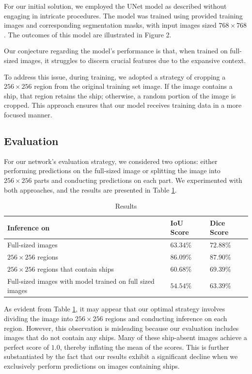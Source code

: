 \documentclass{article}
\begin{document}
For our initial solution, we employed the UNet model as described without engaging in intricate procedures.
The model was trained using provided training images and corresponding segmentation masks, with input
images sized \(768 \times 768\). The outcomes of this model are illustrated in Figure 2.

Our conjecture regarding the model's performance is that, when trained on full-sized images, it struggles
to discern crucial features due to the expansive context.

To address this issue, during training, we adopted a strategy of cropping a \(256 \times 256\) region from
the original training set image. If the image contains a ship, that region retains the ship; otherwise, a random
portion of the image is cropped. This approach ensures that our model receives training data in a more focused manner.


\subsection{Evaluation}

For our network's evaluation strategy, we considered two options: either performing predictions on the full-sized image
or splitting the image into \(256 \times 256\) parts and conducting predictions on each part. We experimented with both
approaches, and the results are presented in Table \ref{results-table}.

\begin{table}
  \caption{Results}
  \label{results-table}
  \centering
  \begin{tabular}{lll}
    \toprule
    Inference on             & IoU Score & Dice Score \\[0.1cm]
    \midrule
    Full-sized images        & $63.34\%$ & $72.88\%$  \\[0.1cm]
    $256 \times 256$ regions & $86.09\%$ & $87.90\%$  \\[0.1cm]
    $256 \times 256$ regions 
      that contain ships     & $60.68\%$ & $69.39\%$  \\[0.1cm]
    Full-sized images with 
      model trained on full 
      sized images           & $54.54\%$ & $63.39\%$  \\[0.1cm]
    \bottomrule
  \end{tabular}
\end{table}

As evident from Table \ref{results-table}, it may appear that our optimal strategy involves dividing the image into
\(256 \times 256\) regions and conducting inference on each region. However, this observation is misleading because
our evaluation includes images that do not contain any ships. Many of these ship-absent images achieve a perfect score
of \(1.0\), thereby inflating the mean of the scores. This is further substantiated by the fact that our results exhibit
a significant decline when we exclusively perform predictions on images containing ships.
\end{document}
